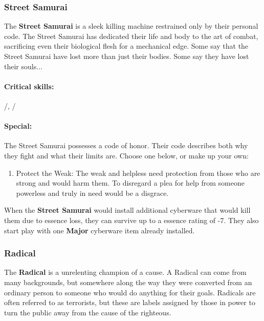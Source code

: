 \documentclass[oneside,10pt]{article}
\begin{document}
\begin{multicols}{2}
\subsubsection{Street Samurai}

The \textbf{Street Samurai} is a sleek killing machine restrained only
by their personal code. The Street Samurai has dedicated their life
and body to the art of combat, sacrificing even their biological flesh
for a mechanical edge. Some say that the Street Samurai have lost more
than just their bodies. Some say they have lost their souls...

\paragraph{Critical skills:}
\twitch/, \oomph/

\paragraph{Special:}
The Street Samurai possesses a code of honor. Their code describes
both why they fight and what their limits are. Choose one below, or
make up your own:
\begin{enumerate}
  \item Protect the Weak: The weak and helpless need protection from
    those who are strong and would harm them. To disregard a plea for
    help from someone powerless and truly in need would be a disgrace. 
\end{enumerate}


\begin{tcolorbox}[title=Special Move]
   When the \textbf{Street Samurai} would
  install additional cyberware that would kill them due to essence
  loss, they can survive up to a essence rating of -7. They also start
  play with one \textbf{Major} cyberware item already installed.
\end{tcolorbox}

\subsubsection{Radical}

The \textbf{Radical} is a unrelenting champion of a cause. A Radical
can come from many backgrounds, but somewhere along the way they were
converted from an ordinary person to someone who would do anything for
their goals. Radicals are often referred to as terrorists, but these
are labels assigned by those in power to turn the public away from the
cause of the righteous.


\end{multicols}
\end{document}
